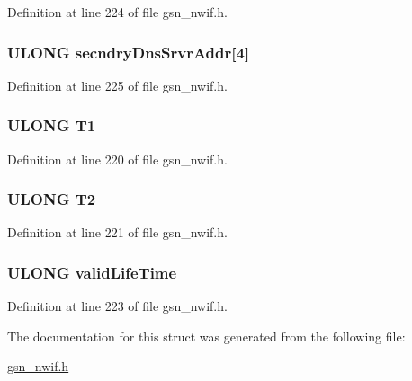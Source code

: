 Definition at line 224 of file gsn\_\-nwif.h.

\hypertarget{a00171_a89652a748ab7f7355a06d17d537f5a1d}{
\subsubsection[{secndryDnsSrvrAddr}]{\setlength{\rightskip}{0pt plus 5cm}ULONG {\bf secndryDnsSrvrAddr}\mbox{[}4\mbox{]}}}
\label{a00171_a89652a748ab7f7355a06d17d537f5a1d}


Definition at line 225 of file gsn\_\-nwif.h.

\hypertarget{a00171_a342daed1ead97af0e1933a8b4a68a10b}{
\subsubsection[{T1}]{\setlength{\rightskip}{0pt plus 5cm}ULONG {\bf T1}}}
\label{a00171_a342daed1ead97af0e1933a8b4a68a10b}


Definition at line 220 of file gsn\_\-nwif.h.

\hypertarget{a00171_ac6512bec63bc298f30b14c885d518679}{
\subsubsection[{T2}]{\setlength{\rightskip}{0pt plus 5cm}ULONG {\bf T2}}}
\label{a00171_ac6512bec63bc298f30b14c885d518679}


Definition at line 221 of file gsn\_\-nwif.h.

\hypertarget{a00171_aa5292f5141e7b76124f517c5e29b1c69}{
\subsubsection[{validLifeTime}]{\setlength{\rightskip}{0pt plus 5cm}ULONG {\bf validLifeTime}}}
\label{a00171_aa5292f5141e7b76124f517c5e29b1c69}


Definition at line 223 of file gsn\_\-nwif.h.



The documentation for this struct was generated from the following file:\begin{DoxyCompactItemize}
\item 
\hyperlink{a00534}{gsn\_\-nwif.h}\end{DoxyCompactItemize}
